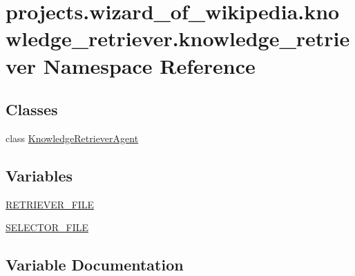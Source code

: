 \hypertarget{namespaceprojects_1_1wizard__of__wikipedia_1_1knowledge__retriever_1_1knowledge__retriever}{}\section{projects.\+wizard\+\_\+of\+\_\+wikipedia.\+knowledge\+\_\+retriever.\+knowledge\+\_\+retriever Namespace Reference}
\label{namespaceprojects_1_1wizard__of__wikipedia_1_1knowledge__retriever_1_1knowledge__retriever}
\subsection*{Classes}
\begin{DoxyCompactItemize}
\item 
class \hyperlink{classprojects_1_1wizard__of__wikipedia_1_1knowledge__retriever_1_1knowledge__retriever_1_1KnowledgeRetrieverAgent}{Knowledge\+Retriever\+Agent}
\end{DoxyCompactItemize}
\subsection*{Variables}
\begin{DoxyCompactItemize}
\item 
\hyperlink{namespaceprojects_1_1wizard__of__wikipedia_1_1knowledge__retriever_1_1knowledge__retriever_add242a9441f7e3279540d29cff5d0459}{R\+E\+T\+R\+I\+E\+V\+E\+R\+\_\+\+F\+I\+LE}
\item 
\hyperlink{namespaceprojects_1_1wizard__of__wikipedia_1_1knowledge__retriever_1_1knowledge__retriever_a29cff879580cac34cbd03e5753d790c6}{S\+E\+L\+E\+C\+T\+O\+R\+\_\+\+F\+I\+LE}
\end{DoxyCompactItemize}


\subsection{Variable Documentation}
\mbox{\label{namespaceprojects_1_1wizard__of__wikipedia_1_1knowledge__retriever_1_1knowledge__retriever_add242a9441f7e3279540d29cff5d0459}} 
